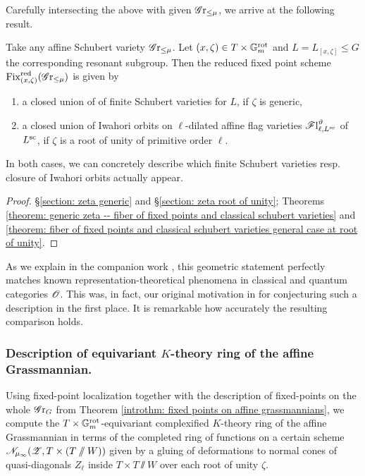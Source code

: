 Carefully intersecting the above with given $\Gr_{\leq \mu}$, we arrive at the following result.
\begin{theorem}
Take any affine Schubert variety $\Gr_{\leq \mu}$.
Let $(x, \zeta) \in T \times \Gm^{\rot}$ and $L=L_{[x, \zeta]} \leq G$ the corresponding resonant subgroup. Then the reduced fixed point scheme $\Fix^{\red}_{(x, \zeta)}(\Gr_{\leq \mu})$ is given by
\begin{enumerate}
    \item[(i)] a closed union of of finite Schubert varieties for $L$, if $\zeta$ is generic,
    \item[(ii)] a closed union of Iwahori orbits on $\ell$-dilated affine flag varieties $\Fl^{\vartheta}_{\ell, L^{\sc}}$ of $L^{\sc}$, if $\zeta$ is a root of unity of primitive order $\ell$.
\end{enumerate}
In both cases, we can concretely describe which finite Schubert varieties resp. closure of Iwahori orbits actually appear.
\end{theorem}
\begin{proof}
\S \ref{section: zeta generic} and \S \ref{section: zeta root of unity}; Theorems \ref{theorem: generic zeta -- fiber of fixed points and classical schubert varieties} and \ref{theorem: fiber of fixed points and classical schubert varieties general case at root of unity}.    
\end{proof}


As we explain in the companion work \cite{HL25}, this geometric statement perfectly matches known representation-theoretical phenomena in classical and quantum categories $\O$. This was, in fact, our original motivation in \cite{HL25} for conjecturing such a description in the first place. It is remarkable how accurately the resulting comparison holds.


\subsubsection{Description of equivariant $K$-theory ring of the affine Grassmannian.}
Using fixed-point localization together with the description of fixed-points on the whole $\Gr_G$ from Theorem \ref{introthm: fixed points on affine grassmannians}, we compute the $T \times \Gm^{\rot}$-equivariant complexified $K$-theory ring of the affine Grassmannian in terms of the completed ring of functions on a certain scheme ${\eN}_{\mu_{\infty}}(\eZ, T \times (T \sslash W))$ given by a gluing of deformations to normal cones of quasi-diagonals $Z_{\ell}$ inside $T \times T \sslash W$ over each root of unity $\zeta$.

